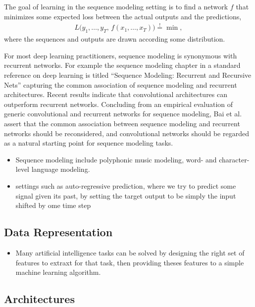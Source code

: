 \documentclass{scrartcl}
\begin{document}
The goal of learning in the sequence modeling setting is to find a network $f$ that minimizes some expected loss between the actual outputs and the predictions, 
\begin{align}
L \big( y_1, \dots, y_T, \, f(x_1,\dots, x_T) \big) \stackrel{\text{!}}{=} \min,
\end{align}
where the sequences and outputs are drawn according some distribution.

For most deep learning practitioners, sequence modeling is synonymous with recurrent networks. For example the sequence modeling chapter in a standard reference on deep learning is titled ``Sequence Modeling: Recurrent and Recursive Nets'' \cite{Goodfellow2016} capturing the common association of sequence modeling and recurrent architectures. Recent results indicate that convolutional architectures can outperform recurrent networks. Concluding from an empirical evaluation of generic convolutional and recurrent networks for sequence modeling, Bai et al. \cite{Bai2018} assert that the common association between sequence modeling and recurrent networks should be reconsidered, and convolutional networks should be regarded as a natural starting point for sequence modeling tasks.


\begin{itemize}
\item Sequence modeling include polyphonic music modeling\cite{Oord2016}, word- and character-level language modeling.
\item settings such as auto-regressive prediction, where we try to predict some signal given its past, by setting the target output to be simply the input shifted by ome time step
\end{itemize}






\subsection{Data Representation}

\begin{itemize}
\item Many artificial intelligence tasks can be solved by designing the right set of features to extraxt for that task, then providing theses features to a simple machine learning algorithm. \cite{Goodfellow2016}
\end{itemize}




\subsection{Architectures}
\end{document}
